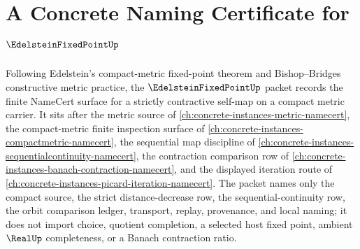 \chapter{A Concrete Naming Certificate for $\EdelsteinFixedPointUp$}
\label{ch:concrete-instances-edelstein-fixed-point-namecert}

Following Edelstein's compact-metric fixed-point theorem and Bishop--Bridges constructive metric practice, the $\EdelsteinFixedPointUp$ packet records the finite NameCert surface for a strictly contractive self-map on a compact metric carrier. It sits after the metric source of \autoref{ch:concrete-instances-metric-namecert}, the compact-metric finite inspection surface of \autoref{ch:concrete-instances-compactmetric-namecert}, the sequential map discipline of \autoref{ch:concrete-instances-sequentialcontinuity-namecert}, the contraction comparison row of \autoref{ch:concrete-instances-banach-contraction-namecert}, and the displayed iteration route of \autoref{ch:concrete-instances-picard-iteration-namecert}. The packet names only the compact source, the strict distance-decrease row, the sequential-continuity row, the orbit comparison ledger, transport, replay, provenance, and local naming; it does not import choice, quotient completion, a selected host fixed point, ambient $\RealUp$ completeness, or a Banach contraction ratio.

